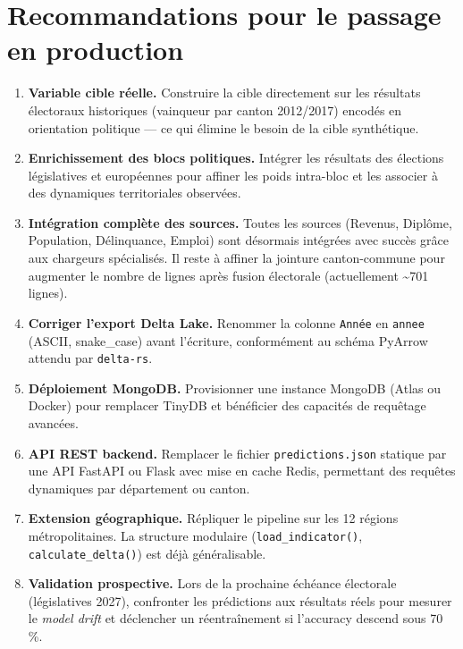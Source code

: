 \documentclass[12pt,a4paper,oneside]{report}
\newcommand{\code}[1]{\texttt{\small #1}}
\newcommand{\pct}[1]{#1\,\%}
\begin{document}
\section*{Recommandations pour le passage en production}

\begin{enumerate}
  \item \textbf{Variable cible réelle.} Construire la cible directement sur les résultats électoraux historiques (vainqueur par canton 2012/2017) encodés en orientation politique — ce qui élimine le besoin de la cible synthétique.

  \item \textbf{Enrichissement des blocs politiques.} Intégrer les résultats des élections législatives et européennes pour affiner les poids intra-bloc et les associer à des dynamiques territoriales observées.

  \item \textbf{Intégration complète des sources.} Toutes les sources (Revenus, Diplôme, Population, Délinquance, Emploi) sont désormais intégrées avec succès grâce aux chargeurs spécialisés. Il reste à affiner la jointure canton-commune pour augmenter le nombre de lignes après fusion électorale (actuellement \textasciitilde{}701 lignes).

  \item \textbf{Corriger l'export Delta Lake.} Renommer la colonne \code{Année} en \code{annee} (ASCII, snake\_case) avant l'écriture, conformément au schéma PyArrow attendu par \texttt{delta-rs}.

  \item \textbf{Déploiement MongoDB.} Provisionner une instance MongoDB (Atlas ou Docker) pour remplacer TinyDB et bénéficier des capacités de requêtage avancées.

  \item \textbf{API REST backend.} Remplacer le fichier \texttt{predictions.json} statique par une API FastAPI ou Flask avec mise en cache Redis, permettant des requêtes dynamiques par département ou canton.

  \item \textbf{Extension géographique.} Répliquer le pipeline sur les 12 régions métropolitaines. La structure modulaire (\code{load\_indicator()}, \code{calculate\_delta()}) est déjà généralisable.

  \item \textbf{Validation prospective.} Lors de la prochaine échéance électorale (législatives 2027), confronter les prédictions aux résultats réels pour mesurer le \textit{model drift} et déclencher un réentraînement si l'accuracy descend sous \pct{70}.
\end{enumerate}
\end{document}
